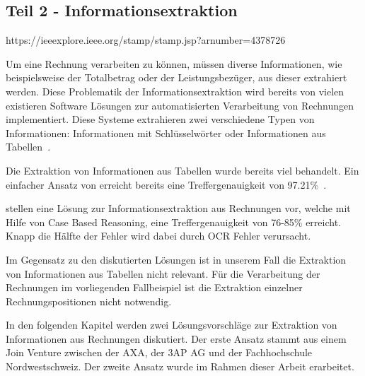 \subsection{Teil 2 - Informationsextraktion}

https://ieeexplore.ieee.org/stamp/stamp.jsp?arnumber=4378726








Um eine Rechnung verarbeiten zu können, müssen diverse Informationen, wie beispielsweise der Totalbetrag oder der Leistungsbezüger, aus dieser extrahiert werden. Diese Problematik der Informationsextraktion wird bereits von vielen existieren Software Lösungen zur automatisierten Verarbeitung von Rechnungen implementiert. Diese Systeme extrahieren zwei verschiedene Typen von Informationen: Informationen mit Schlüsselwörter oder Informationen aus Tabellen~\autocite{Hamza}.

Die Extraktion von Informationen aus Tabellen wurde bereits viel behandelt. Ein einfacher Ansatz von \textcite{MandalInHamza} erreicht bereits eine Treffergenauigkeit von 97.21\%~\autocite{Hamza}.

\textcite{Hamzet} stellen eine Lösung zur Informationsextraktion aus Rechnungen vor, welche mit Hilfe von Case Based Reasoning, eine Treffergenauigkeit von 76-85\% erreicht. Knapp die Hälfte der Fehler wird dabei durch OCR Fehler verursacht.

Im Gegensatz zu den diskutierten Lösungen ist in unserem Fall die Extraktion von Informationen aus Tabellen nicht relevant. Für die Verarbeitung der Rechnungen im vorliegenden Fallbeispiel ist die Extraktion einzelner Rechnungspositionen nicht notwendig.

In den folgenden Kapitel werden zwei Lösungsvorschläge zur Extraktion von Informationen aus Rechnungen diskutiert. Der erste Ansatz stammt aus einem Join Venture zwischen der AXA, der 3AP AG und der Fachhochschule Nordwestschweiz. Der zweite Ansatz wurde im Rahmen dieser Arbeit erarbeitet.


